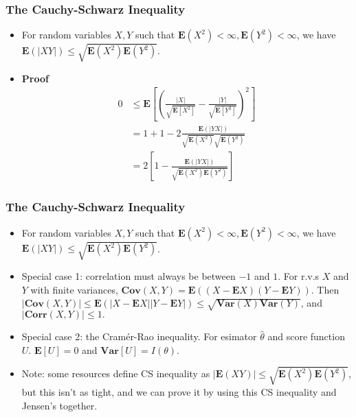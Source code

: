 \documentclass[handout]{beamer}
\newcommand{\BE}{\mathbf{E}}
\newcommand{\BV}{\mathbf{Var}}
\begin{document}
\frame
{
  \frametitle{The Cauchy-Schwarz Inequality}

   \begin{itemize}
       \item<1->[]
   \begin{Theorem} For random variables $X, Y$ such that $\BE(X^2)<\infty, \BE(Y^2)<\infty$, we have $\BE(|XY|) \leq \sqrt{\BE(X^2)\BE(Y^2)} $. 
   \end{Theorem}

\item<2-> \textbf{Proof} 
\begin{align*}
0 &\le \BE\left[ \left( \frac{|X| }{\sqrt{ \BE[X^2] }} - \frac{|Y| }{\sqrt{ \BE[Y^2] }} \right)^2 \right]\\
&= 1 + 1 -2 \frac{\BE(|YX|) }{\sqrt{\BE(X^2)}\sqrt{\BE(Y^2)} } \\
&= 2\left[1 - \frac{\BE(|YX|) }{\sqrt{\BE(X^2) \BE(Y^2)} }\right]
\end{align*}

\end{itemize}
}


\frame
{
  \frametitle{The Cauchy-Schwarz Inequality}

   \begin{itemize}
       \item<1->[]
   \begin{Theorem} For random variables $X, Y$ such that $\BE(X^2)<\infty, \BE(Y^2)<\infty$, we have $\BE(|XY|) \leq \sqrt{\BE(X^2)\BE(Y^2)} $. 
   \end{Theorem}

\item<2-> Special case 1: correlation must always be between $-1$ and $1$. For r.v.s $X$ and $Y$ with finite variances, $\mathbf{Cov} (X, Y)= \BE((X-\BE X)(Y-\BE Y ))$. Then $|\mathbf{Cov} (X, Y)|\leq \BE(|X-\BE X||Y-\BE Y|)\leq \sqrt{\BV(X)\BV(Y)}$, and $|\mathbf{Corr} (X,Y)|\leq 1.$

\item<3-> Special case 2: the Cram\'er-Rao inequality. For esimator $\hat{\theta}$ and score function $U$. $\BE[U] = 0$ and $\BV\left[ U\right] = I(\theta)$. 

\item<4-> Note: some resources define CS inequality as $|\BE(XY)| \leq \sqrt{\BE(X^2)\BE(Y^2)}$, but this isn't as tight, and we can prove it by using this CS inequality and Jensen's together.

 
         
\end{itemize}
}
\end{document}
